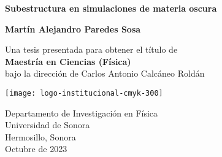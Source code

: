 
\setlength{\headheight}{15.25pt}

\setcounter{page}{1}


\newcommand{\thesistitle}{Subestructura en simulaciones de materia oscura}
\newcommand{\minombre}{Martín Alejandro Paredes Sosa}
\newcommand{\supername}{Carlos Antonio Calcáneo Roldán}
\newcommand{\mespresentado}{Octubre de 2023}
\newpage

\thispagestyle{empty}
\begin{center}
  \vspace*{0.5cm}
  {\Huge \bf \thesistitle}

  \vspace*{2cm}
  {\LARGE\bf \minombre}

  \vfill

  {\Large Una tesis presentada para obtener el título de\\
    \vspace{.3cm}
    {\bf Maestría en Ciencias (Física)}\\
    \vspace{.6cm}
    bajo la dirección de \supername}
  \vspace*{0.9cm}

   \begin{center}
   \texttt{[image: logo-institucional-cmyk-300]}
   \end{center}

  {\large Departamento de Investigación en Física\\
          [-3mm] Universidad de Sonora\\
          [-3mm] Hermosillo, Sonora\\
          [1mm]  \mespresentado}

\end{center}

